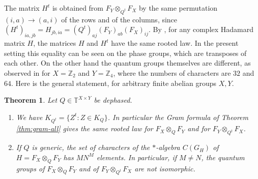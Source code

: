 \documentclass[11pt,reqno]{amsart}
\newtheorem{thm}{Theorem}[section]
\theoremstyle{definition}
\numberwithin{equation}{section}
\begin{document}
The matrix $H^t$ is obtained from $F_Y\otimes_{Q^t}F_X$ by the same permutation $(i,a)\to(a,i)$ of the rows and of the columns, since $(H^t)_{ia,jb}=H_{jb,ia}=(Q^t)_{aj}(F_Y)_{ab}(F_X)_{ij}$. By \cite[Theorem 2.3]{BO26}, for any complex Hadamard matrix $H$, the matrices $H$ and $H^t$ have the same rooted law. In the present setting this equality can be seen on the phase groups, which are transposes of each other. On the other hand the quantum groups themselves are different, as observed in \cite[Section 4.3]{BO26} for $X=\mathbb Z_2$ and $Y=\mathbb Z_4$, where the numbers of characters are $32$ and $64$. Here is the general statement, for arbitrary finite abelian groups $X,Y$.

\begin{thm}\label{thm:transpose-all}
Let $Q\in\mathbb T^{X\times Y}$ be dephased.
\begin{enumerate}
\item We have $K_{Q^t}=\{Z^t:Z\in K_Q\}$. In particular the Gram formula of Theorem \ref{thm:gram-all} gives the same rooted law for $F_X\otimes_QF_Y$ and for $F_Y\otimes_{Q^t}F_X$.
\item If $Q$ is generic, the set of characters of the $*$-algebra $C(G_H)$ of $H=F_X\otimes_QF_Y$ has $MN^M$ elements. In particular, if $M\neq N$, the quantum groups of $F_X\otimes_QF_Y$ and of $F_Y\otimes_{Q^t}F_X$ are not isomorphic.
\end{enumerate}
\end{thm}
\end{document}
